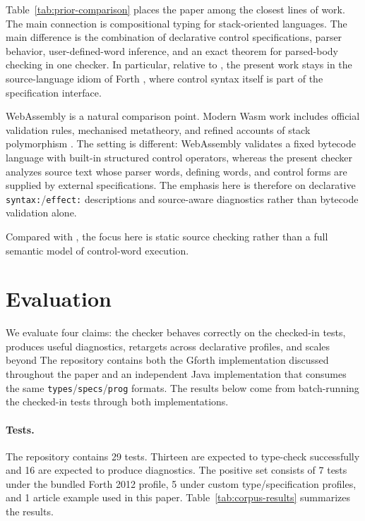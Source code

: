 \documentclass[acmsmall,screen,review,anonymous,nonacm]{acmart}
\begin{document}
Table~\ref{tab:prior-comparison} places the paper among the closest lines of work.
The main connection is compositional typing for stack-oriented languages. The main
difference is the combination of declarative control specifications, parser behavior,
user-defined-word inference, and an exact theorem for parsed-body checking in one
checker. In particular, relative to \cite{saabas2006compositional}, the present work
stays in the source-language idiom of Forth \cite{forth2012standard}, where control
syntax itself is part of the specification interface.

WebAssembly is a natural comparison point. Modern Wasm work includes official validation
rules, mechanised metatheory, and refined accounts of stack polymorphism
\cite{webassembly2026spec,watt2018wasm,mcdermott2022wasm}. The setting is different:
WebAssembly validates a fixed bytecode language with built-in structured control
operators, whereas the present checker analyzes source text whose parser words, defining
words, and control forms are supplied by external specifications. The emphasis here is
therefore on declarative \texttt{syntax:}/\texttt{effect:} descriptions and source-aware
diagnostics rather than bytecode validation alone.

Compared with \cite{power2004formal}, the focus here is static source checking rather
than a full semantic model of control-word execution.

\section{Evaluation}
We evaluate four claims: the checker behaves correctly on the checked-in tests,
produces useful diagnostics, retargets across declarative profiles, and scales beyond
The repository contains both the Gforth implementation discussed throughout
the paper and an independent Java implementation that consumes the same
\texttt{types}/\texttt{specs}/\texttt{prog} formats. The results below come from
batch-running the checked-in tests through both implementations.

\paragraph{Tests.}
The repository contains 29 tests. Thirteen are expected to type-check successfully and
16 are expected to produce diagnostics. The positive set consists of 7 tests under the
bundled Forth 2012 profile, 5 under custom type/specification profiles, and 1 article
example used in this paper. Table~\ref{tab:corpus-results} summarizes the results.
\end{document}

